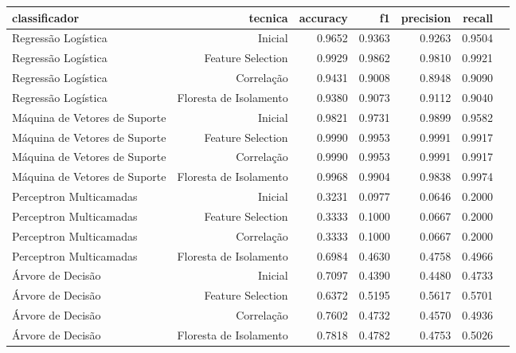 \begin{tabular}{|l|r|r|r|r|r|r|}
\hline
                 classificador &                 tecnica &  accuracy &      f1 &  precision &  recall \\
\hline
           Regressão Logística &                 Inicial &    0.9652 &  0.9363 &     0.9263 &  0.9504 \\
           Regressão Logística &       Feature Selection &    0.9929 &  0.9862 &     0.9810 &  0.9921 \\
           Regressão Logística &              Correlação &    0.9431 &  0.9008 &     0.8948 &  0.9090 \\
           Regressão Logística &  Floresta de Isolamento &    0.9380 &  0.9073 &     0.9112 &  0.9040 \\
 Máquina de Vetores de Suporte &                 Inicial &    0.9821 &  0.9731 &     0.9899 &  0.9582 \\
 Máquina de Vetores de Suporte &       Feature Selection &    0.9990 &  0.9953 &     0.9991 &  0.9917 \\
 Máquina de Vetores de Suporte &              Correlação &    0.9990 &  0.9953 &     0.9991 &  0.9917 \\
 Máquina de Vetores de Suporte &  Floresta de Isolamento &    0.9968 &  0.9904 &     0.9838 &  0.9974 \\
       Perceptron Multicamadas &                 Inicial &    0.3231 &  0.0977 &     0.0646 &  0.2000 \\
       Perceptron Multicamadas &       Feature Selection &    0.3333 &  0.1000 &     0.0667 &  0.2000 \\
       Perceptron Multicamadas &              Correlação &    0.3333 &  0.1000 &     0.0667 &  0.2000 \\
       Perceptron Multicamadas &  Floresta de Isolamento &    0.6984 &  0.4630 &     0.4758 &  0.4966 \\
             Árvore de Decisão &                 Inicial &    0.7097 &  0.4390 &     0.4480 &  0.4733 \\
             Árvore de Decisão &       Feature Selection &    0.6372 &  0.5195 &     0.5617 &  0.5701 \\
             Árvore de Decisão &              Correlação &    0.7602 &  0.4732 &     0.4570 &  0.4936 \\
             Árvore de Decisão &  Floresta de Isolamento &    0.7818 &  0.4782 &     0.4753 &  0.5026 \\
\hline
\end{tabular}
